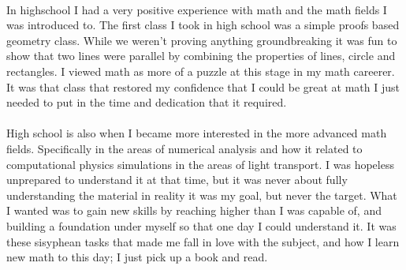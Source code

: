 \documentclass{article}
\begin{document}
    \paragraph{}
      In highschool I had a very positive experience with math and the math fields I was introduced to. The first class I took in high school was a simple proofs based geometry class. While we weren't proving anything groundbreaking it was fun to show that two lines were parallel by combining the properties of lines, circle and rectangles. I viewed math as more of a puzzle at this stage in my math careerer. It was that class that restored my confidence that I could be great at math I just needed to put in the time and dedication that it required. 

    \paragraph{}
      High school is also when I became more interested in the more advanced math fields. Specifically in the areas of numerical analysis and how it related to computational physics simulations in the areas of light transport. I was hopeless unprepared to understand it at that time, but it was never about fully understanding the material in reality it was my goal, but never the target. What I wanted was to gain new skills by reaching higher than I was capable of, and building a foundation under myself so that one day I could understand it. It was these sisyphean tasks that made me fall in love with the subject, and how I learn new math to this day; I just pick up a book and read.
  

    
  
\end{document}
